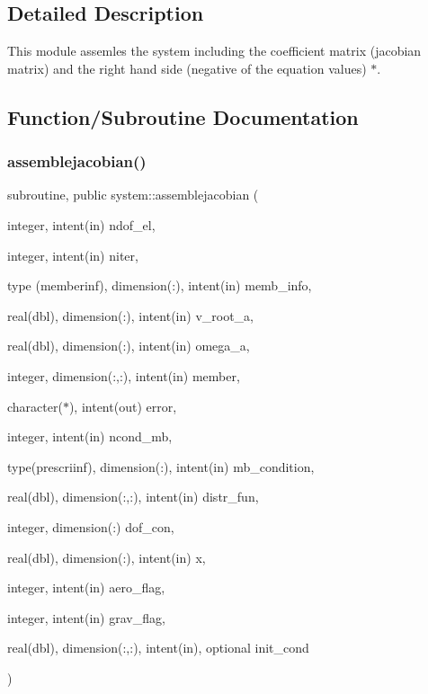 \subsection{Detailed Description}
This module assemles the system including the coefficient matrix (jacobian matrix) and the right hand side (negative of the equation values) $\ast$. 

\subsection{Function/\+Subroutine Documentation}
\mbox{\label{namespacesystem_aca86d62bded01533c138c9e2298cc804}} 
\subsubsection{\texorpdfstring{assemblejacobian()}{assemblejacobian()}}
{\footnotesize\ttfamily subroutine, public system\+::assemblejacobian (\begin{DoxyParamCaption}\item[{integer, intent(in)}]{ndof\+\_\+el,  }\item[{integer, intent(in)}]{niter,  }\item[{type (memberinf), dimension(\+:), intent(in)}]{memb\+\_\+info,  }\item[{real(dbl), dimension(\+:), intent(in)}]{v\+\_\+root\+\_\+a,  }\item[{real(dbl), dimension(\+:), intent(in)}]{omega\+\_\+a,  }\item[{integer, dimension(\+:,\+:), intent(in)}]{member,  }\item[{character($\ast$), intent(out)}]{error,  }\item[{integer, intent(in)}]{ncond\+\_\+mb,  }\item[{type(prescriinf), dimension(\+:), intent(in)}]{mb\+\_\+condition,  }\item[{real(dbl), dimension(\+:,\+:), intent(in)}]{distr\+\_\+fun,  }\item[{integer, dimension(\+:)}]{dof\+\_\+con,  }\item[{real(dbl), dimension(\+:), intent(in)}]{x,  }\item[{integer, intent(in)}]{aero\+\_\+flag,  }\item[{integer, intent(in)}]{grav\+\_\+flag,  }\item[{real(dbl), dimension(\+:,\+:), intent(in), optional}]{init\+\_\+cond }\end{DoxyParamCaption})}



